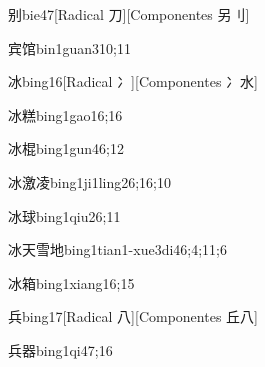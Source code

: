 \begin{verbete}{别}{bie4}{7}[Radical 刀][Componentes 另⺉]
\end{verbete}

\begin{verbete}{宾馆}{bin1guan3}{10;11}
\end{verbete}

\begin{verbete}{冰}{bing1}{6}[Radical 冫][Componentes 冫水]
\end{verbete}

\begin{verbete}{冰糕}{bing1gao1}{6;16}
\end{verbete}

\begin{verbete}{冰棍}{bing1gun4}{6;12}
\end{verbete}

\begin{verbete}{冰激凌}{bing1ji1ling2}{6;16;10}
\end{verbete}

\begin{verbete}{冰球}{bing1qiu2}{6;11}
\end{verbete}

\begin{verbete}{冰天雪地}{bing1tian1-xue3di4}{6;4;11;6}
\end{verbete}

\begin{verbete}{冰箱}{bing1xiang1}{6;15}
\end{verbete}

\begin{verbete}{兵}{bing1}{7}[Radical 八][Componentes 丘八]
\end{verbete}

\begin{verbete}{兵器}{bing1qi4}{7;16}
\end{verbete}

